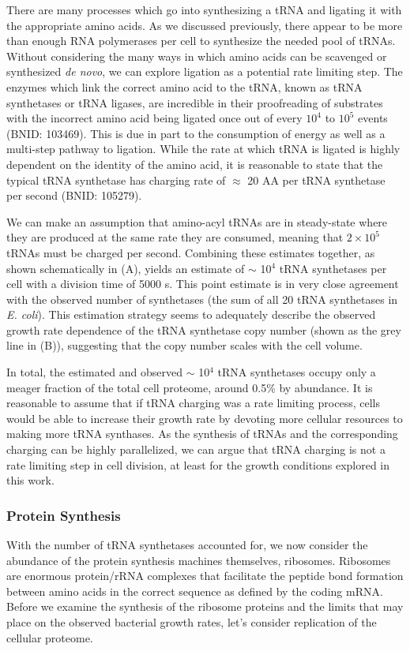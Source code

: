 There are many processes which go into synthesizing a tRNA and ligating it
with the appropriate amino acids. As we discussed previously, there appear to
be more than enough RNA polymerases per cell to synthesize the needed pool of
tRNAs. Without considering the many ways in which amino acids can be
scavenged or synthesized \textit{de novo}, we can explore ligation as a
potential rate limiting step. The enzymes which link the correct amino acid
to the tRNA, known as tRNA synthetases or tRNA ligases, are incredible in
their proofreading of substrates with the incorrect amino acid being ligated
once out of every $10^4$ to $10^5$ events (BNID: 103469).
This is due in part to the consumption of energy as well as a multi-step
pathway to ligation. While the rate at which tRNA is ligated is highly
dependent on the identity of the amino acid, it is reasonable to state that
the typical tRNA synthetase has charging rate of $\approx$ 20 AA per tRNA
synthetase per second (BNID: 105279).

We can make an assumption that amino-acyl tRNAs are in steady-state where they
are produced at the same rate they are consumed, meaning that $2 \times 10^5$
tRNAs must be charged per second. Combining these estimates together, as shown schematically
in (A), yields an estimate of $\sim$ 10$^4$ tRNA
synthetases per cell with a division time of 5000 s. This point estimate is in
very close agreement with the observed number of synthetases (the sum of all 20
tRNA synthetases in \textit{E. coli}). This estimation strategy seems to
adequately describe the observed growth rate dependence of the tRNA synthetase copy
number (shown as the grey line in (B)), suggesting that
the copy number scales with the cell volume.

In total, the estimated and observed $\sim$ 10$^4$ tRNA synthetases occupy
only a meager fraction of the total cell proteome, around 0.5\% by abundance. It
is reasonable to assume that if tRNA charging was a rate limiting process, cells
would be able to increase their growth rate by devoting more cellular resources
to making more tRNA synthases. As the synthesis of tRNAs and the corresponding
charging can be highly parallelized, we can argue that tRNA charging is not a
rate limiting step in cell division, at least for the growth conditions explored
in this work.

\subsubsection{Protein Synthesis}
With the number of tRNA synthetases accounted for, we now consider the abundance
of the protein synthesis machines themselves, ribosomes. Ribosomes are enormous
protein/rRNA complexes that facilitate the peptide bond formation between amino
acids in the correct sequence as defined by the coding mRNA. Before we examine
the synthesis of the ribosome proteins and the limits that may place on the
observed bacterial growth rates, let's consider replication of the cellular
proteome.


